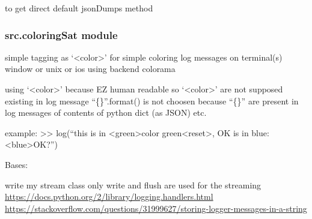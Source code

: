 \documentclass[a4paper,10pt,english]{sphinxmanual}
\begin{document}

\begin{fulllineitems}
\label{commands/apidoc/src:src.catchAll.jsonDumps}
to get direct default jsonDumps method

\end{fulllineitems}



\subsubsection{src.coloringSat module}
\label{commands/apidoc/src:module-src.coloringSat}\label{commands/apidoc/src:src-coloringsat-module}
simple tagging as `\textless{}color\textgreater{}' for simple coloring log messages on terminal(s)
window or unix or ios using backend colorama

using `\textless{}color\textgreater{}' because EZ human readable
so `\textless{}color\textgreater{}' are not supposed existing in log message
``\{\}''.format() is not choosen because ``\{\}'' are present
in log messages of contents of python dict (as JSON) etc.

example:
\textgreater{}\textgreater{} log(``this is in \textless{}green\textgreater{}color green\textless{}reset\textgreater{}, OK is in blue: \textless{}blue\textgreater{}OK?'')

\begin{fulllineitems}
\label{commands/apidoc/src:src.coloringSat.ColoringStream}
Bases: 

write my stream class
only write and flush are used for the streaming
\url{https://docs.python.org/2/library/logging.handlers.html}
\url{https://stackoverflow.com/questions/31999627/storing-logger-messages-in-a-string}

\begin{fulllineitems}
\label{commands/apidoc/src:src.coloringSat.ColoringStream.flush}
\end{fulllineitems}


\begin{fulllineitems}
\label{commands/apidoc/src:src.coloringSat.ColoringStream.write}
\end{fulllineitems}


\end{fulllineitems}
\end{document}
